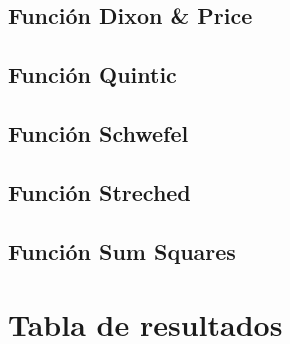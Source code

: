 \documentclass[10pt]{article}
\begin{document}
\subsection{Función Dixon \& Price}
\begin{center}
  
\end{center}

\subsection{Función Quintic}
\begin{center}
  
\end{center}

\subsection{Función Schwefel}
\begin{center}
  
\end{center}

\subsection{Función Streched}
\begin{center}
  
\end{center}

\subsection{Función Sum Squares}
\begin{center}
  
\end{center}

\section{Tabla de resultados}
\end{document}
